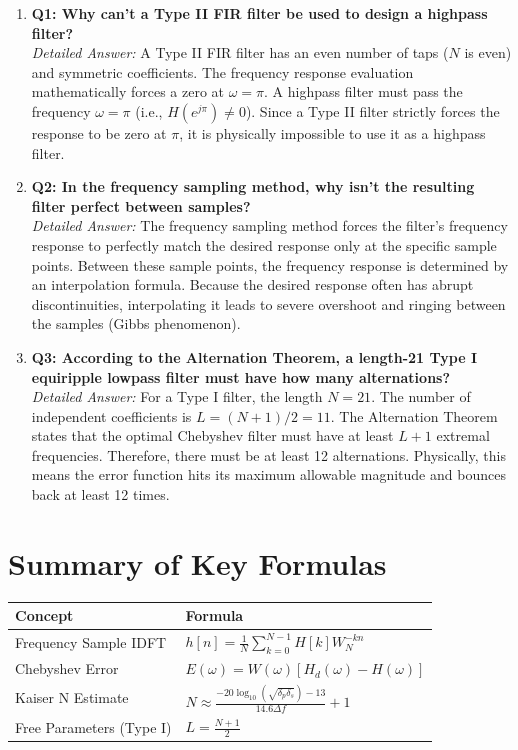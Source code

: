 \documentclass[11pt,a4paper]{article}
\begin{document}
\begin{enumerate}
    \item \textbf{Q1: Why can't a Type II FIR filter be used to design a highpass filter?} \\
    \textit{Detailed Answer:} A Type II FIR filter has an even number of taps ($N$ is even) and symmetric coefficients. The frequency response evaluation mathematically forces a zero at $\omega = \pi$. A highpass filter must pass the frequency $\omega = \pi$ (i.e., $H(e^{j\pi}) \neq 0$). Since a Type II filter strictly forces the response to be zero at $\pi$, it is physically impossible to use it as a highpass filter.

    \item \textbf{Q2: In the frequency sampling method, why isn't the resulting filter perfect between samples?} \\
    \textit{Detailed Answer:} The frequency sampling method forces the filter's frequency response to perfectly match the desired response only at the specific sample points. Between these sample points, the frequency response is determined by an interpolation formula. Because the desired response often has abrupt discontinuities, interpolating it leads to severe overshoot and ringing between the samples (Gibbs phenomenon).

    \item \textbf{Q3: According to the Alternation Theorem, a length-21 Type I equiripple lowpass filter must have how many alternations?} \\
    \textit{Detailed Answer:} For a Type I filter, the length $N=21$. The number of independent coefficients is $L = (N+1)/2 = 11$. The Alternation Theorem states that the optimal Chebyshev filter must have at least $L+1$ extremal frequencies. Therefore, there must be at least 12 alternations. Physically, this means the error function hits its maximum allowable magnitude and bounces back at least 12 times.
\end{enumerate}

\section{Summary of Key Formulas}

\begin{table}[H]
\centering
\begin{tabular}{l l}
\toprule
\textbf{Concept} & \textbf{Formula} \\
\midrule
Frequency Sample IDFT & $h[n] = \frac{1}{N}\sum_{k=0}^{N-1} H[k] W_N^{-kn}$ \\
Chebyshev Error & $E(\omega) = W(\omega) [H_d(\omega) - H(\omega)]$ \\
Kaiser N Estimate & $N \approx \frac{-20 \log_{10}(\sqrt{\delta_p \delta_s}) - 13}{14.6 \Delta f} + 1$ \\
Free Parameters (Type I) & $L = \frac{N+1}{2}$ \\
\bottomrule
\end{tabular}
\end{table}
\end{document}
